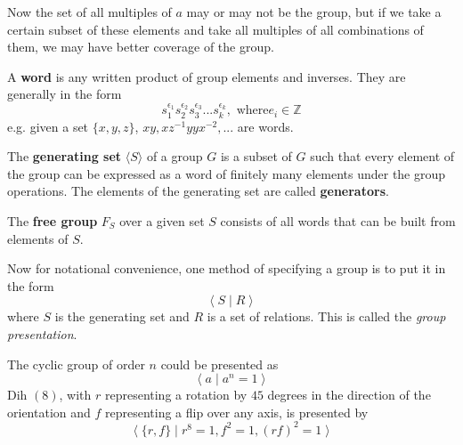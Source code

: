   Now the set of all multiples of $a$ may or may not be the group, but if we take a certain subset of these elements and take all multiples of all combinations of them, we may have better coverage of the group. 

  \begin{definition}[Word]
    A \textbf{word} is any written product of group elements and inverses. They are generally in the form
    \begin{equation}
      s_{1}^{\epsilon_{1}} s_{2}^{\epsilon_{2}} s_{3}^{\epsilon_{3}}... s_{k}^{\epsilon_{k}}, \text{ where} e_i \in \mathbb{Z}
    \end{equation} 
    e.g. given a set $\{x,y,z\}$, $x y, x z^{-1} y y x^{-2},...$ are words. 
  \end{definition}

  \begin{definition}
    The \textbf{generating set} $\langle S \rangle$ of a group $G$ is a subset of $G$ such that every element of the group can be expressed as a word of finitely many elements under the group operations. The elements of the generating set are called \textbf{generators}.
  \end{definition}

  \begin{definition}
    The \textbf{free group} $F_{S}$ over a given set $S$ consists of all words that can be built from elements of $S$. 
  \end{definition}

  Now for notational convenience, one method of specifying a group is to put it in the form
  \begin{equation}
    \big\langle \; S \; | \; R \;\big\rangle
  \end{equation}
  where $S$ is the generating set and $R$ is a set of relations. This is called the \textit{group presentation}. 

  \begin{example}
    The cyclic group of order $n$ could be presented as
    \begin{equation}
      \big\langle \; a \; | \; a^{n} = 1 \;\big\rangle
    \end{equation}
    Dih $(8)$, with $r$ representing a rotation by $45$ degrees in the direction of the orientation and $f$ representing a flip over any axis, is presented by
    \begin{equation}
      \big\langle \; \{ r, f\} \; | \; r^{8} = 1, f^{2} = 1, (r f)^{2} = 1 \;\big\rangle
    \end{equation}
  \end{example}

